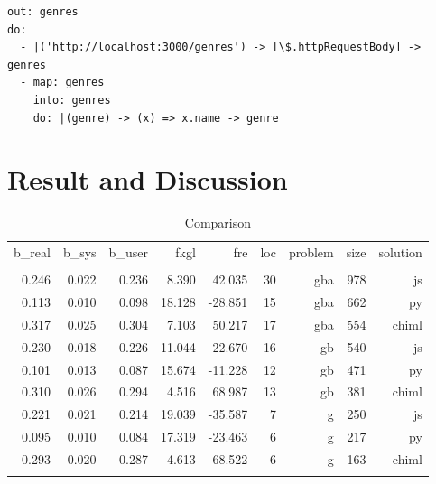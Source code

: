 \documentclass[conference]{IEEEtran}
\begin{document}
\begin{lstlisting}[caption=CHIML Solution for problem-g, label=chimlSolution, basicstyle=\footnotesize, breaklines=true]
out: genres
do:
  - |('http://localhost:3000/genres') -> [\$.httpRequestBody] -> genres
  - map: genres
    into: genres
    do: |(genre) -> (x) => x.name -> genre
\end{lstlisting}


\section{Result and Discussion}

\begin{table}[]
\centering
\caption{Comparison}
\label{tbl:comparison}
\begin{tabular}{@{}rrrrrrrrr@{}}
\toprule
  b\_real & b\_sys  & b\_user &   fkgl &     fre &  loc & problem  & size &  solution \\
          &         &         &        &         &      &          &      &           \\ \midrule 
  0.246   & 0.022   & 0.236   &  8.390 &  42.035 &  30  &   gba    & 978  &     js    \\
  0.113   & 0.010   & 0.098   & 18.128 & -28.851 &  15  &   gba    & 662  &     py    \\
  0.317   & 0.025   & 0.304   &  7.103 &  50.217 &  17  &   gba    & 554  &  chiml    \\
  0.230   & 0.018   & 0.226   & 11.044 &  22.670 &  16  &    gb    & 540  &     js    \\
  0.101   & 0.013   & 0.087   & 15.674 & -11.228 &  12  &    gb    & 471  &     py    \\
  0.310   & 0.026   & 0.294   &  4.516 &  68.987 &  13  &    gb    & 381  &  chiml    \\
  0.221   & 0.021   & 0.214   & 19.039 & -35.587 &   7  &     g    & 250  &     js    \\
  0.095   & 0.010   & 0.084   & 17.319 & -23.463 &   6  &     g    & 217  &     py    \\
  0.293   & 0.020   & 0.287   &  4.613 &  68.522 &   6  &     g    & 163  &  chiml    \\
          &         &         &        &         &      &          &      &           \\ \midrule 
\end{tabular}
\end{table}
\end{document}
